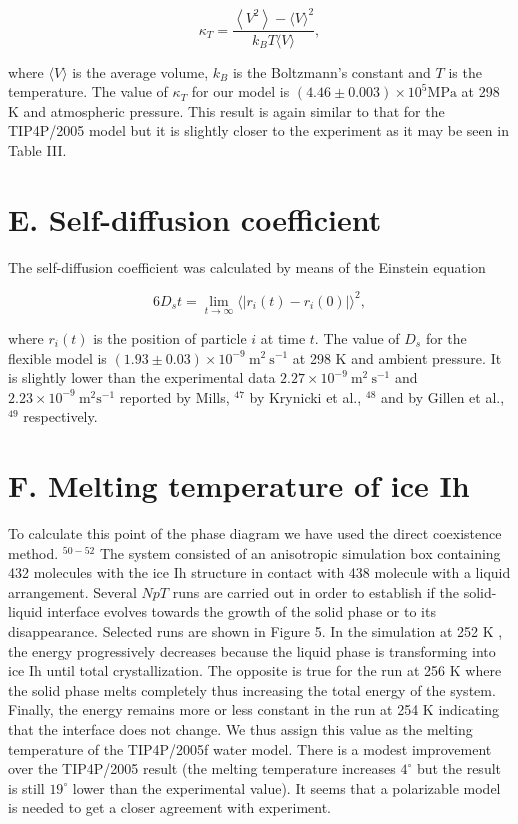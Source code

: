 \documentclass[10pt]{article}
\begin{document}
\begin{equation*}
\kappa_{T}=\frac{\left\langle V^{2}\right\rangle-\langle V\rangle^{2}}{k_{B} T\langle V\rangle}, \tag{7}
\end{equation*}


where $\langle V\rangle$ is the average volume, $k_{B}$ is the Boltzmann's constant and $T$ is the temperature. The value of $\kappa_{T}$ for our model is $(4.46 \pm 0.003) \times 10^{5} \mathrm{MPa}$ at 298 K and atmospheric pressure. This result is again similar to that for the TIP4P/2005 model but it is slightly closer to the experiment as it may be seen in Table III.

\section*{E. Self-diffusion coefficient}
The self-diffusion coefficient was calculated by means of the Einstein equation


\begin{equation*}
6 D_{s} t=\lim _{t \rightarrow \infty}\langle | r_{i}(t)-r_{i}(0)| \rangle^{2}, \tag{8}
\end{equation*}


where $r_{i}(t)$ is the position of particle $i$ at time $t$. The value of $D_{s}$ for the flexible model is $(1.93 \pm 0.03) \times 10^{-9} \mathrm{~m}^{2} \mathrm{~s}^{-1}$ at 298 K and ambient pressure. It is slightly lower than the experimental data $2.27 \times 10^{-9} \mathrm{~m}^{2} \mathrm{~s}^{-1}$ and $2.23 \times 10^{-9} \mathrm{~m}^{2} \mathrm{s}^{-1}$ reported by Mills, ${ }^{47}$ by Krynicki et al., ${ }^{48}$ and by Gillen et al., ${ }^{49}$ respectively.

\section*{F. Melting temperature of ice Ih}
To calculate this point of the phase diagram we have used the direct coexistence method. ${ }^{50-52}$ The system consisted of an anisotropic simulation box containing 432 molecules with the ice Ih structure in contact with 438 molecule with a liquid arrangement. Several $N p T$ runs are carried out in order to establish if the solid-liquid interface evolves towards the growth of the solid phase or to its disappearance. Selected runs are shown in Figure 5. In the simulation at 252 K , the energy progressively decreases because the liquid phase is transforming into ice Ih until total crystallization. The opposite is true for the run at 256 K where the solid phase melts completely thus increasing the total energy of the system. Finally, the energy remains more or less constant in the run at 254 K indicating that the interface does not change. We thus assign this value as the melting temperature of the TIP4P/2005f water model. There is a modest improvement over the TIP4P/2005 result (the melting temperature increases $4^{\circ}$ but the result is still $19^{\circ}$ lower than the experimental value). It seems that a polarizable model is needed to get a closer agreement with experiment.
\end{document}
